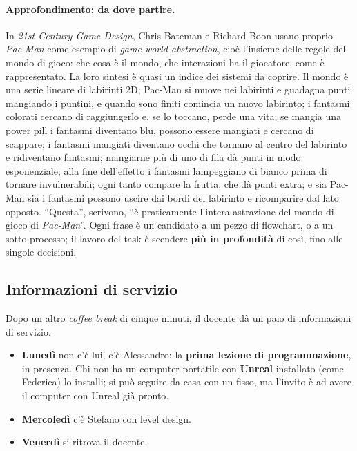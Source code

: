 \paragraph{Approfondimento: da dove partire.} In \emph{21st Century Game
Design}, Chris Bateman e Richard Boon usano proprio \emph{Pac-Man} come
esempio di \emph{game world abstraction}, cioè l'insieme delle regole del
mondo di gioco: che cosa è il mondo, che interazioni ha il giocatore, come è
rappresentato. La loro sintesi è quasi un indice dei sistemi da coprire.
Il mondo è una serie lineare di labirinti 2D; Pac-Man si muove nei labirinti
e guadagna punti mangiando i puntini, e quando sono finiti comincia un nuovo
labirinto; i fantasmi colorati cercano di raggiungerlo e, se lo toccano,
perde una vita; se mangia una power pill i fantasmi diventano blu, possono
essere mangiati e cercano di scappare; i fantasmi mangiati diventano occhi
che tornano al centro del labirinto e ridiventano fantasmi; mangiarne più di
uno di fila dà punti in modo esponenziale; alla fine dell'effetto i fantasmi
lampeggiano di bianco prima di tornare invulnerabili; ogni tanto compare la
frutta, che dà punti extra; e sia Pac-Man sia i fantasmi possono uscire dai
bordi del labirinto e ricomparire dal lato opposto. ``Questa'', scrivono, ``è
praticamente l'intera astrazione del mondo di gioco di \emph{Pac-Man}''. Ogni
frase è un candidato a un pezzo di flowchart, o a un sotto-processo; il
lavoro del task è scendere \textbf{più in profondità} di così, fino alle
singole decisioni.

\subsection{Informazioni di servizio}

Dopo un altro \emph{coffee break} di cinque minuti, il docente dà un paio di
informazioni di servizio.
\begin{itemize}
  \item \textbf{Lunedì} non c'è lui, c'è Alessandro: la \textbf{prima lezione
        di programmazione}, in presenza. Chi non ha un computer portatile con
        \textbf{Unreal} installato (come Federica) lo installi; si può
        seguire da casa con un fisso, ma l'invito è ad avere il computer con
        Unreal già pronto.
  \item \textbf{Mercoledì} c'è Stefano con level design.
  \item \textbf{Venerdì} si ritrova il docente.
\end{itemize}

